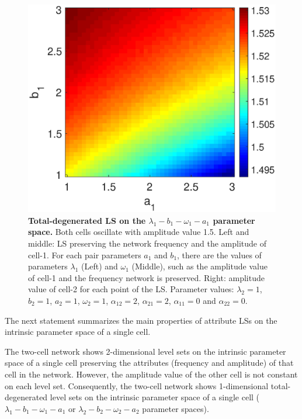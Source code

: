 \begin{figure}[h]
\begin{minipage}{0.32\linewidth}
\begin{center}
\end{center}
  \end{minipage} 
   \begin{minipage}{0.32\linewidth}
  \begin{center}
\includegraphics[width=1\linewidth]{Images/photo26_3.eps}
\end{center}

  \end{minipage} 
  
  \caption{\textbf{Total-degenerated LS on the $\lambda_{1}-b_{1}-\omega_{1}-a_{1}$ parameter space.} Both cells oscillate with amplitude value 1.5. Left and middle: LS preserving the network frequency and the amplitude of cell-1. For each pair parameters $a_{1}$ and $b_{1}$, there are the values of parameters $\lambda_{1}$ (Left) and $\omega_{1}$ (Middle), such as the amplitude value of cell-1 and the frequency network is preserved. Right: amplitude value of cell-2 for each point of the LS. Parameter values: $\lambda_{2} = 1$, $b_{2}=1$, $a_{2} = 1$, $\omega_{2} = 1$, $\alpha_{12}=2$, $\alpha_{21}=2$, $\alpha_{11}=0$ and $\alpha_{22}=0$.}
  \label{photo26}
\end{figure}

The next statement summarizes the main properties of attribute LSs on the intrinsic parameter space of a single cell.

\begin{Statement}
The two-cell network shows 2-dimensional level sets on the intrinsic parameter space of a single cell preserving the attributes (frequency and amplitude) of that cell in the network. However, the amplitude value of the other cell is not constant on each level set. Consequently, the two-cell network shows 1-dimensional total-degenerated level sets on the intrinsic parameter space of a single cell ($\lambda_{1}-b_{1}-\omega_{1}-a_{1}$ or $\lambda_{2}-b_{2}-\omega_{2}-a_{2}$ parameter spaces).
\end{Statement}

